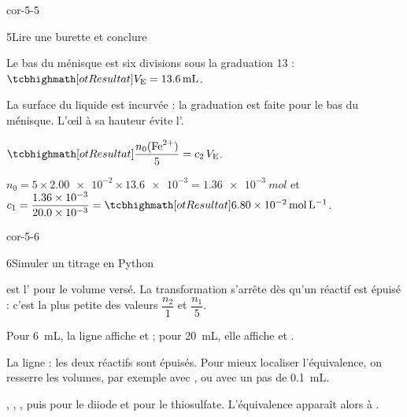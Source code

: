 \begin{blocLivre}{cor-5-5}
\begin{corrige}{5}{Lire une burette et conclure}
\begin{questions}
\item Le bas du ménisque est six divisions sous la graduation 13 : $\res{V_\mathrm{E}=\qty{13,6}{mL}}$.
\item La surface du liquide est incurvée : la graduation est faite pour le bas du ménisque. L'œil à sa hauteur évite
l'.
\item $\res{\dfrac{n_0(\ce{Fe^{2+}})}{5}=c_2\,V_\mathrm{E}}$.
\item $n_0=5\times\num{2.00e-2}\times\num{13.6e-3}=\qty{1,36e-3}{mol}$ et $c_1=\dfrac{\num{1.36e-3}}{\num{20.0e-3}}=\res{\qty{6,80e-2}{mol.L^{-1}}}$.
\end{questions}
\end{corrige}
\end{blocLivre}
\begin{blocLivre}{cor-5-6}
\begin{corrige}{6}{Simuler un titrage en Python}
\begin{questions}
\item {} est l' pour le volume  versé. La transformation s'arrête dès qu'un réactif est épuisé :
c'est la plus petite des valeurs $\dfrac{n_2}{1}$ et $\dfrac{n_1}{5}$.
\item Pour \qty{6}{mL}, la ligne affiche  et  ; pour \qty{20}{mL}, elle affiche
 et .
\item La ligne  : les deux réactifs sont épuisés. Pour mieux localiser l'équivalence, on resserre les volumes,
par exemple avec , ou avec un pas de \qty{0,1}{mL}.
\item {}, , , puis  pour le diiode et 
pour le thiosulfate. L'équivalence apparaît alors à .
\end{questions}
\end{corrige}
\end{blocLivre}
